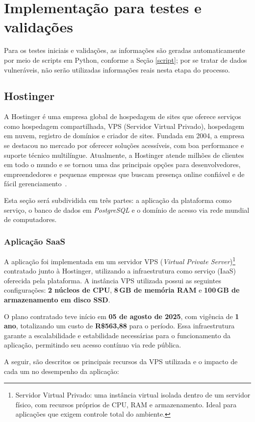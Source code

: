 \section{Implementação para testes e validações}
\par Para os testes iniciais e validações, as informações são geradas automaticamente por meio de scripts em Python, conforme a Seção \ref{script}; por se tratar de dados vulneráveis, não serão utilizadas informações reais nesta etapa do processo.



\subsection{Hostinger}
\par A Hostinger é uma empresa global de hospedagem de sites que oferece serviços como hospedagem compartilhada, VPS (Servidor Virtual Privado), hospedagem em nuvem, registro de domínios e criador de sites. Fundada em 2004, a empresa se destacou no mercado por oferecer soluções acessíveis, com boa performance e suporte técnico multilíngue. Atualmente, a Hostinger atende milhões de clientes em todo o mundo e se tornou uma das principais opções para desenvolvedores, empreendedores e pequenas empresas que buscam presença online confiável e de fácil gerenciamento~\cite{hostinger2025}.
\par Esta seção será subdividida em três partes: a aplicação da plataforma como serviço, o banco de dados em \textit{PostgreSQL} e o domínio de acesso via rede mundial de computadores.


\subsubsection{Aplicação SaaS}
\par A aplicação foi implementada em um servidor VPS (\textit{Virtual Private Server})\footnote{Servidor Virtual Privado: uma instância virtual isolada dentro de um servidor físico, com recursos próprios de CPU, RAM e armazenamento. Ideal para aplicações que exigem controle total do ambiente.} contratado junto à Hostinger, utilizando a infraestrutura como serviço (IaaS) oferecida pela plataforma. A instância VPS utilizada possui as seguintes configurações: \textbf{2 núcleos de CPU}, \textbf{8\,GB de memória RAM} e \textbf{100\,GB de armazenamento em disco SSD}.
\par O plano contratado teve início em \textbf{05 de agosto de 2025}, com vigência de \textbf{1 ano}, totalizando um custo de \textbf{R\$563,88} para o período. Essa infraestrutura garante a escalabilidade e estabilidade necessárias para o funcionamento da aplicação, permitindo seu acesso contínuo via rede pública.
\par A seguir, são descritos os principais recursos da VPS utilizada e o impacto de cada um no desempenho da aplicação:

